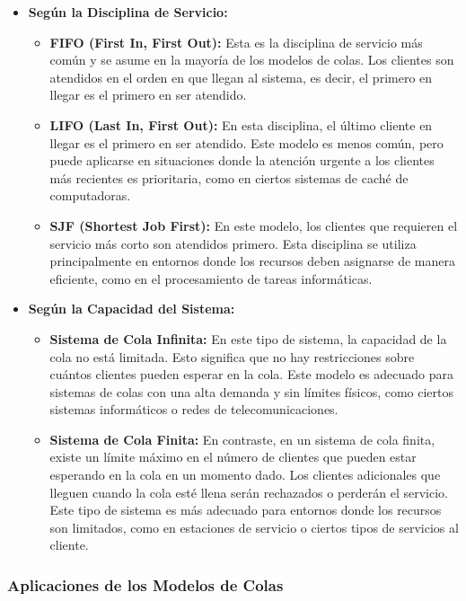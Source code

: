 \documentclass{article}
\begin{document}
\begin{itemize}
    \item \textbf{Según la Disciplina de Servicio:}
    \begin{itemize}
        \item \textbf{FIFO (First In, First Out):} Esta es la disciplina de servicio más común y se asume en la mayoría de los modelos de colas. Los clientes son atendidos en el orden en que llegan al sistema, es decir, el primero en llegar es el primero en ser atendido.
        \item \textbf{LIFO (Last In, First Out):} En esta disciplina, el último cliente en llegar es el primero en ser atendido. Este modelo es menos común, pero puede aplicarse en situaciones donde la atención urgente a los clientes más recientes es prioritaria, como en ciertos sistemas de caché de computadoras.
        \item \textbf{SJF (Shortest Job First):} En este modelo, los clientes que requieren el servicio más corto son atendidos primero. Esta disciplina se utiliza principalmente en entornos donde los recursos deben asignarse de manera eficiente, como en el procesamiento de tareas informáticas.
    \end{itemize}
    
    \item \textbf{Según la Capacidad del Sistema:}
    \begin{itemize}
        \item \textbf{Sistema de Cola Infinita:} En este tipo de sistema, la capacidad de la cola no está limitada. Esto significa que no hay restricciones sobre cuántos clientes pueden esperar en la cola. Este modelo es adecuado para sistemas de colas con una alta demanda y sin límites físicos, como ciertos sistemas informáticos o redes de telecomunicaciones.
        \item \textbf{Sistema de Cola Finita:} En contraste, en un sistema de cola finita, existe un límite máximo en el número de clientes que pueden estar esperando en la cola en un momento dado. Los clientes adicionales que lleguen cuando la cola esté llena serán rechazados o perderán el servicio. Este tipo de sistema es más adecuado para entornos donde los recursos son limitados, como en estaciones de servicio o ciertos tipos de servicios al cliente.
    \end{itemize}
\end{itemize}

\subsubsection{Aplicaciones de los Modelos de Colas}
\end{document}
